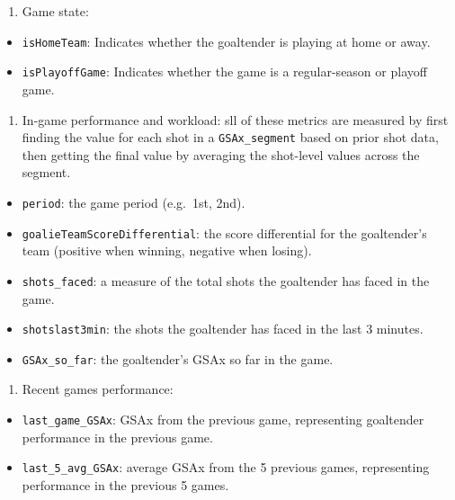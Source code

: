 \documentclass[
  letterpaper,
  DIV=11,
  numbers=noendperiod]{scrartcl}
\providecommand{\tightlist}{%
  \setlength{\itemsep}{0pt}\setlength{\parskip}{0pt}}\usepackage{longtable,booktabs,array}
\begin{document}
\begin{enumerate}
\def\labelenumi{\arabic{enumi}.}
\tightlist
\item
  Game state:
\end{enumerate}

\begin{itemize}
\tightlist
\item
  \texttt{isHomeTeam}: Indicates whether the goaltender is playing at
  home or away.
\item
  \texttt{isPlayoffGame}: Indicates whether the game is a regular-season
  or playoff game.
\end{itemize}

\begin{enumerate}
\def\labelenumi{\arabic{enumi}.}
\setcounter{enumi}{1}
\tightlist
\item
  In-game performance and workload: sll of these metrics are measured by
  first finding the value for each shot in a \texttt{GSAx\_segment}
  based on prior shot data, then getting the final value by averaging
  the shot-level values across the segment.
\end{enumerate}

\begin{itemize}
\tightlist
\item
  \texttt{period}: the game period (e.g.~1st, 2nd).
\item
  \texttt{goalieTeamScoreDifferential}: the score differential for the
  goaltender's team (positive when winning, negative when losing).
\item
  \texttt{shots\_faced}: a measure of the total shots the goaltender has
  faced in the game.
\item
  \texttt{shotslast3min}: the shots the goaltender has faced in the last
  3 minutes.
\item
  \texttt{GSAx\_so\_far}: the goaltender's GSAx so far in the game.
\end{itemize}

\begin{enumerate}
\def\labelenumi{\arabic{enumi}.}
\setcounter{enumi}{2}
\tightlist
\item
  Recent games performance:
\end{enumerate}

\begin{itemize}
\tightlist
\item
  \texttt{last\_game\_GSAx}: GSAx from the previous game, representing
  goaltender performance in the previous game.\\
\item
  \texttt{last\_5\_avg\_GSAx}: average GSAx from the 5 previous games,
  representing performance in the previous 5 games.
\end{itemize}
\end{document}
